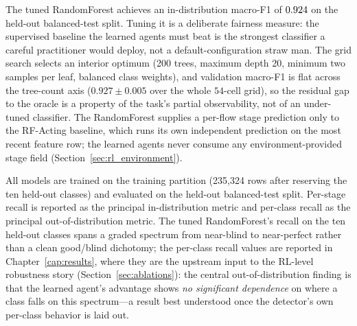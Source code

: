 The tuned RandomForest achieves an in-distribution macro-F1 of $0.924$ on the held-out balanced-test split. Tuning it is a deliberate fairness measure: the supervised baseline the learned agents must beat is the strongest classifier a careful practitioner would deploy, not a default-configuration straw man. The grid search selects an interior optimum (200 trees, maximum depth 20, minimum two samples per leaf, balanced class weights), and validation macro-F1 is flat across the tree-count axis ($0.927 \pm 0.005$ over the whole $54$-cell grid), so the residual gap to the oracle is a property of the task's partial observability, not of an under-tuned classifier. The RandomForest supplies a per-flow stage prediction only to the RF-Acting baseline, which runs its own independent prediction on the most recent feature row; the learned agents never consume any environment-provided stage field (Section~\ref{sec:rl_environment}).

All models are trained on the training partition (235{,}324 rows after reserving the ten held-out classes) and evaluated on the held-out balanced-test split. Per-stage recall is reported as the principal in-distribution metric and per-class recall as the principal out-of-distribution metric. The tuned RandomForest's recall on the ten held-out classes spans a graded spectrum from near-blind to near-perfect rather than a clean good/blind dichotomy; the per-class recall values are reported in Chapter~\ref{cap:results}, where they are the upstream input to the RL-level robustness story (Section~\ref{sec:ablations}): the central out-of-distribution finding is that the learned agent's advantage shows \emph{no significant dependence} on where a class falls on this spectrum---a result best understood once the detector's own per-class behavior is laid out.

